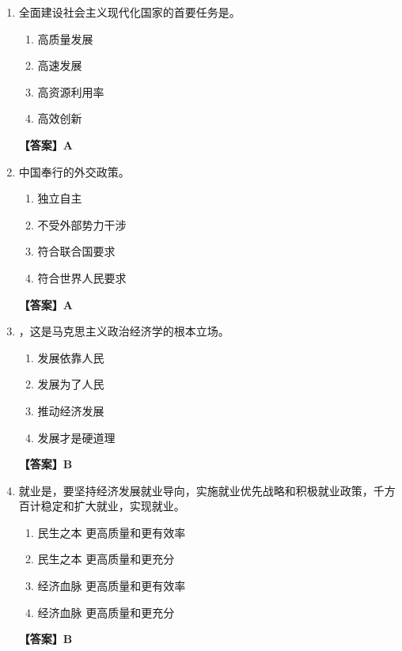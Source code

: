 \documentclass[UTF8,11pt,a4paper]{ctexart}
\begin{document}
\begin{enumerate}[label=\textbf{\arabic*.}, leftmargin=2.5em, itemsep=0.7em]
\begin{enumerate}[label=\Alph*., leftmargin=2em, itemsep=0.1em, topsep=0.15em]
\end{enumerate}
\textbf{【答案】D}
\item 全面建设社会主义现代化国家的首要任务是\allowbreak\underline{\hspace{4em}}。
\begin{enumerate}[label=\Alph*., leftmargin=2em, itemsep=0.1em, topsep=0.15em]
\item 高质量发展
\item 高速发展
\item 高资源利用率
\item 高效创新
\end{enumerate}
\textbf{【答案】A}
\item 中国奉行\allowbreak\underline{\hspace{4em}}的外交政策。
\begin{enumerate}[label=\Alph*., leftmargin=2em, itemsep=0.1em, topsep=0.15em]
\item 独立自主
\item 不受外部势力干涉
\item 符合联合国要求
\item 符合世界人民要求
\end{enumerate}
\textbf{【答案】A}
\item \allowbreak\underline{\hspace{4em}}，这是马克思主义政治经济学的根本立场。
\begin{enumerate}[label=\Alph*., leftmargin=2em, itemsep=0.1em, topsep=0.15em]
\item 发展依靠人民
\item 发展为了人民
\item 推动经济发展
\item 发展才是硬道理
\end{enumerate}
\textbf{【答案】B}
\item 就业是\allowbreak\underline{\hspace{4em}}，要坚持经济发展就业导向，实施就业优先战略和积极就业政策，千方百计稳定和扩大就业，实现\allowbreak\underline{\hspace{4em}}就业。
\begin{enumerate}[label=\Alph*., leftmargin=2em, itemsep=0.1em, topsep=0.15em]
\item 民生之本 更高质量和更有效率
\item 民生之本 更高质量和更充分
\item 经济血脉 更高质量和更有效率
\item 经济血脉 更高质量和更充分
\end{enumerate}
\textbf{【答案】B}

\end{enumerate}
\end{document}
